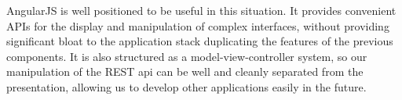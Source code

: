AngularJS is well positioned to be useful in this situation.
It provides convenient APIs for the display and manipulation of
complex interfaces, without providing significant bloat to the
application stack duplicating the features of the previous components.
It is also structured as a model-view-controller system, so our
manipulation of the REST api can be well and cleanly separated from
the presentation, allowing us to develop other applications easily in
the future.  

